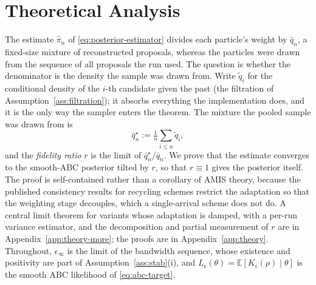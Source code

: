 \documentclass[10pt]{article}
\theoremstyle{plain}
\theoremstyle{definition}
\begin{document}
\section{Theoretical Analysis}\label{sec:theory}
The estimate $\widehat\pi_n$ of \eqref{eq:posterior-estimator} divides each particle's weight by $\bar q_n$, a fixed-size mixture of reconstructed proposals, whereas the particles were drawn from the sequence of all proposals the run used. The question is whether the denominator is the density the sample was drawn from. Write $\tilde q_i$ for the conditional density of the $i$-th candidate given the past (the filtration of Assumption~\ref{ass:filtration}); it absorbs everything the implementation does, and it is the only way the sampler enters the theorem. The mixture the pooled sample was drawn from is
\begin{equation}
\bar q^\star_n:=\tfrac1n\textstyle\sum_{i\le n}\tilde q_i,
\label{eq:draw-mixture}
\end{equation}
and the \emph{fidelity ratio} $r$ is the limit of $\bar q^\star_n/\bar q_n$. We prove that the estimate converges to the smooth-ABC posterior tilted by $r$, so that $r\equiv1$ gives the posterior itself. The proof is self-contained rather than a corollary of AMIS theory, because the published consistency results for recycling schemes \citep{marin2019consistency} restrict the adaptation so that the weighting stage decouples, which a single-arrival scheme does not do. A central limit theorem for variants whose adaptation is damped, with a per-run variance estimator, and the decomposition and partial measurement of $r$ are in Appendix~\ref{app:theory-more}; the proofs are in Appendix~\ref{app:theory}. Throughout, $\epsilon_\infty$ is the limit of the bandwidth sequence, whose existence and positivity are part of Assumption~\ref{ass:stab}(i), and $L_\epsilon(\theta)=\mathbb{E}[K_\epsilon(\rho)\mid\theta]$ is the smooth ABC likelihood of \eqref{eq:abc-target}.
\end{document}

